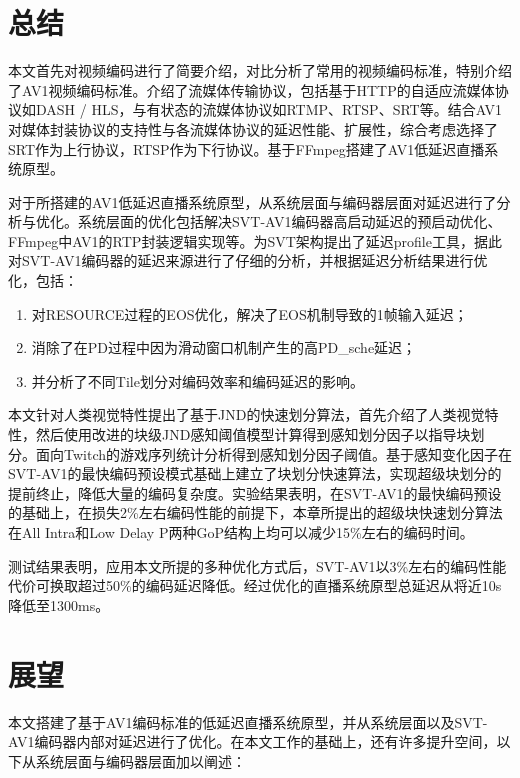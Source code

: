 
\begin{summary}

  \section{总结}
  本文首先对视频编码进行了简要介绍，对比分析了常用的视频编码标准，特别介绍了AV1视频编码标准。介绍了流媒体传输协议，包括基于HTTP的自适应流媒体协议如DASH / HLS，与有状态的流媒体协议如RTMP、RTSP、SRT等。结合AV1对媒体封装协议的支持性与各流媒体协议的延迟性能、扩展性，综合考虑选择了SRT作为上行协议，RTSP作为下行协议。基于FFmpeg搭建了AV1低延迟直播系统原型。

  对于所搭建的AV1低延迟直播系统原型，从系统层面与编码器层面对延迟进行了分析与优化。系统层面的优化包括解决SVT-AV1编码器高启动延迟的预启动优化、FFmpeg中AV1的RTP封装逻辑实现等。为SVT架构提出了延迟profile工具，据此对SVT-AV1编码器的延迟来源进行了仔细的分析，并根据延迟分析结果进行优化，包括：
  \begin{enumerate}
  	\item 对RESOURCE过程的EOS优化，解决了EOS机制导致的1帧输入延迟；
  	\item 消除了在PD过程中因为滑动窗口机制产生的高PD\_sche延迟；
  	\item 并分析了不同Tile划分对编码效率和编码延迟的影响。
  \end{enumerate}

  本文针对人类视觉特性提出了基于JND的快速划分算法，首先介绍了人类视觉特性，然后使用改进的块级JND感知阈值模型计算得到感知划分因子以指导块划分。面向Twitch的游戏序列统计分析得到感知划分因子阈值。基于感知变化因子在SVT-AV1的最快编码预设模式基础上建立了块划分快速算法，实现超级块划分的提前终止，降低大量的编码复杂度。实验结果表明，在SVT-AV1的最快编码预设的基础上，在损失2\%左右编码性能的前提下，本章所提出的超级块快速划分算法在All Intra和Low Delay P两种GoP结构上均可以减少15\%左右的编码时间。

	测试结果表明，应用本文所提的多种优化方式后，SVT-AV1以3\%左右的编码性能代价可换取超过50\%的编码延迟降低。经过优化的直播系统原型总延迟从将近10s降低至1300ms。

	\section{展望}
	本文搭建了基于AV1编码标准的低延迟直播系统原型，并从系统层面以及SVT-AV1编码器内部对延迟进行了优化。在本文工作的基础上，还有许多提升空间，以下从系统层面与编码器层面加以阐述：


\end{summary}
